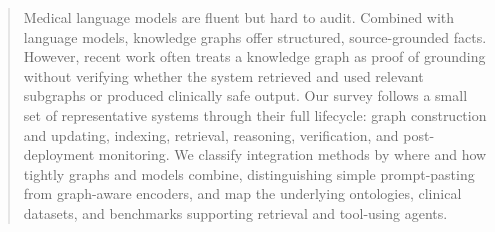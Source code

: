 \begin{abstract}

Medical language models are fluent but hard to audit. Combined with language models, knowledge graphs offer structured, source-grounded facts. However, recent work often treats a knowledge graph as proof of grounding without verifying whether the system retrieved and used relevant subgraphs or produced clinically safe output. Our survey follows a small set of representative systems through their full lifecycle: graph construction and updating, indexing, retrieval, reasoning, verification, and post-deployment monitoring. We classify integration methods by where and how tightly graphs and models combine, distinguishing simple prompt-pasting from graph-aware encoders, and map the underlying ontologies, clinical datasets, and benchmarks supporting retrieval and tool-using agents.


\end{abstract}
